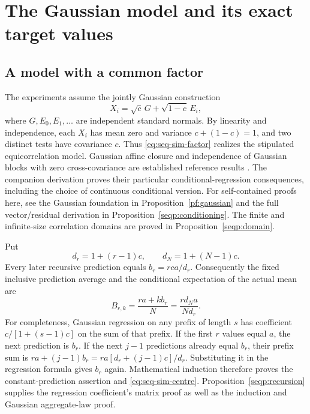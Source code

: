 

\chapter{The Gaussian model and its exact target values}
\label{sec:seq-sim-model}

\section{A model with a common factor}
The experiments assume the jointly Gaussian construction
\begin{equation}
 X_i=\sqrt c\,G+\sqrt{1-c}\,E_i,
 \label{eq:seq-sim-factor}
\end{equation}
where \(G,E_0,E_1,\ldots\) are independent standard normals. By linearity
and independence, each \(X_i\) has mean zero and variance
\(c+(1-c)=1\), and two distinct tests have covariance \(c\). Thus
\eqref{eq:seq-sim-factor} realizes the stipulated equicorrelation model.
Gaussian affine closure and independence of Gaussian blocks with zero
cross-covariance are established reference results
\citep[Chapter 3, especially Theorems 3.3.1--3.3.2]{gallager2013}.
The companion derivation proves their particular conditional-regression
consequences, including the choice of continuous conditional version.
For self-contained proofs here, see the Gaussian foundation in
Proposition~\ref{pf:gaussian} and the full vector/residual derivation in
Proposition~\ref{seqp:conditioning}. The finite and infinite-size
correlation domains are proved in Proposition~\ref{seqp:domain}.

Put
\[
 d_r=1+(r-1)c,\qquad d_N=1+(N-1)c.
\]
Every later recursive prediction equals
\(b_r=rca/d_r\). Consequently the fixed inclusive prediction average and
the conditional expectation of the actual mean are
\begin{equation}
 B_{r,k}=\frac{ra+kb_r}{N}
        =\frac{r d_N a}{N d_r}.
 \label{eq:seq-sim-centre}
\end{equation}
For completeness, Gaussian regression on any prefix of length \(s\)
has coefficient \(c/[1+(s-1)c]\) on the sum of that prefix. If the first
\(r\) values equal \(a\), the next prediction is \(b_r\). If the next
\(j-1\) predictions already equal \(b_r\), their prefix sum is
\(ra+(j-1)b_r=ra[d_r+(j-1)c]/d_r\). Substituting it in the regression
formula gives \(b_r\) again. Mathematical induction therefore proves the
constant-prediction assertion and \eqref{eq:seq-sim-centre}.
Proposition~\ref{seqp:recursion} supplies the regression coefficient's
matrix proof as well as the induction and Gaussian aggregate-law proof.

